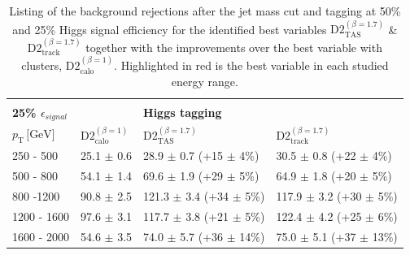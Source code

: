 \begin{table}[]
\begin{tabular}{llll}
                                                     &                                                &                                          &                                          \\
 \multicolumn{1}{l||}{\textbf{25\% $\epsilon_{signal}$}} &                                                &      \textbf{Higgs tagging}                                    &                                          \\ \hline
\multicolumn{1}{l||}{$p_{\mathrm{T}} \, \text{[GeV]}$}           & \multicolumn{1}{l|}{$\text{D2}_{\text{calo}}^{(\beta=1)}$} & \multicolumn{1}{l|}{$\text{D2}_{\text{TAS}}^{(\beta=1.7)}$} & \multicolumn{1}{l|}{$\text{D2}_{\text{track}}^{(\beta=1.7)}$} \\ \hline \hline
\multicolumn{1}{l||}{250 - 500}                       & \multicolumn{1}{l|}{25.1 $\pm$ 0.6}                     & \multicolumn{1}{l|}{28.9 $\pm$ 0.7 (+15 $\pm$ 4\%)}        & 	\multicolumn{1}{l|}{\cellcolor{Red!50}30.5 $\pm$ 0.8 (+22 $\pm$ 4\%)}       \\
\multicolumn{1}{l||}{500 - 800}                       & \multicolumn{1}{l|}{54.1 $\pm$ 1.4}                     & \multicolumn{1}{l|}{\cellcolor{Red!50}69.6 $\pm$ 1.9 (+29 $\pm$ 5\%)}       & 	\multicolumn{1}{l|}{64.9 $\pm$ 1.8 (+20 $\pm$ 5\%)}        \\
\multicolumn{1}{l||}{800 -1200}                       & \multicolumn{1}{l|}{90.8 $\pm$ 2.5}                     & \multicolumn{1}{l|}{\cellcolor{Red!50}121.3 $\pm$ 3.4 (+34 $\pm$ 5\%)}       & 	\multicolumn{1}{l|}{117.9 $\pm$ 3.2 (+30 $\pm$ 5\%)}       \\
\multicolumn{1}{l||}{1200 - 1600}                     & \multicolumn{1}{l|}{97.6 $\pm$ 3.1}                     & \multicolumn{1}{l|}{117.7 $\pm$ 3.8 (+21 $\pm$ 5\%)}       & 	\multicolumn{1}{l|}{\cellcolor{Red!50}122.4 $\pm$ 4.2 (+25 $\pm$ 6\%)}      \\
\multicolumn{1}{l||}{1600 - 2000}                     & \multicolumn{1}{l|}{54.6 $\pm$ 3.5}                     & \multicolumn{1}{l|}{74.0 $\pm$ 5.7 (+36 $\pm$ 14\%)}      & 	\multicolumn{1}{l|}{\cellcolor{Red!50}75.0 $\pm$ 5.1 (+37 $\pm$ 13\%)}       \\ \hline
\end{tabular}
\caption{Listing of the background rejections after the jet mass cut and tagging at 50\% and 25\% Higgs signal efficiency for the identified best variables $\text{D2}_{\text{TAS}}^{(\beta=1.7)}$ \& $\text{D2}_{\text{track}}^{(\beta=1.7)}$ together with the improvements over the best variable with clusters, $\text{D2}_{\text{calo}}^{(\beta=1)}$. Highlighted in red is the best variable in each studied energy range.}\label{table:higgs_improvement}
\end{table}

